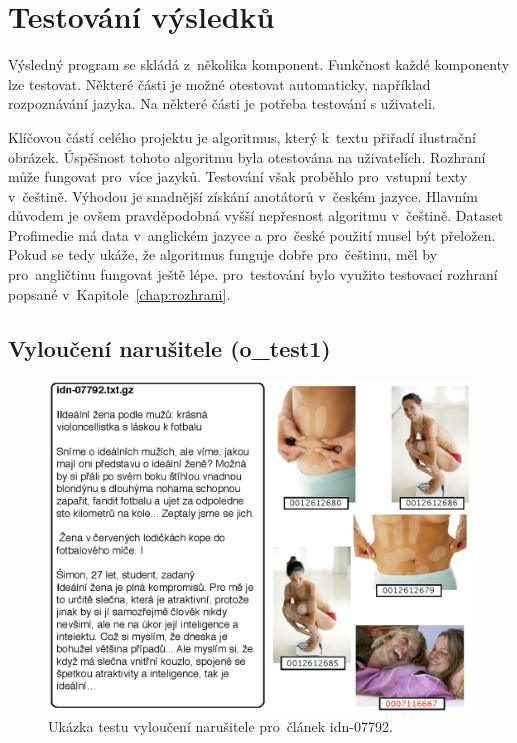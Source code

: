 \chapter{Testování výsledků}
\label{chap:evaluace}

Výsledný program se skládá z~několika komponent. Funkčnost každé komponenty lze testovat. Některé části je možné otestovat automaticky, například rozpoznávání jazyka. Na některé části je potřeba testování s uživateli.

Klíčovou částí celého projektu je algoritmus, který k~textu přiřadí ilustrační obrázek. Úspěšnost tohoto algoritmu byla otestována na uživatelích. Rozhraní může fungovat pro~více jazyků. Testování však proběhlo pro~vstupní texty v~češtině. Výhodou je snadnější získání anotátorů v~českém jazyce. Hlavním důvodem je ovšem pravděpodobná vyšší nepřesnost algoritmu v~češtině. Dataset Profimedie má data v~anglickém jazyce a pro~české použití musel být přeložen. Pokud se tedy ukáže, že algoritmus funguje dobře pro~češtinu, měl by pro~angličtinu fungovat ještě lépe. pro~testování bylo využito testovací rozhraní popsané v~Kapitole~\ref{chap:rozhrani}.


\section{Vyloučení narušitele (o\_test1)}

\begin{figure}[h]
  \centering
  \includegraphics[width=150mm]{evaluace_1.eps}
  \caption{Ukázka testu vyloučení narušitele pro~článek idn-07792.}
  \label{fig:evaluace_1}
\end{figure}



